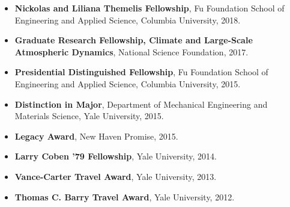 \documentclass[10pt,oneside]{article}
\begin{document}
\mbox{}\vspace{-\dimexpr\baselineskip\relax}

\begin{itemize}[label={}]

  \item \textbf{Nickolas and Liliana Themelis Fellowship}, Fu Foundation School of Engineering and Applied Science, Columbia University, 2018.

  \item \textbf{Graduate Research Fellowship, Climate and Large-Scale Atmospheric Dynamics}, National Science Foundation, 2017.

  \item \textbf{Presidential Distinguished Fellowship}, Fu Foundation School of Engineering and Applied Science, Columbia University, 2015.

  \item \textbf{Distinction in Major}, Department of Mechanical Engineering and Materials Science, Yale University, 2015.

  \item \textbf{Legacy Award}, New Haven Promise, 2015.

  \item \textbf{Larry Coben ’79 Fellowship}, Yale University, 2014.

  \item \textbf{Vance-Carter Travel Award}, Yale University, 2013.

  \item \textbf{Thomas C. Barry Travel Award}, Yale University, 2012.

\end{itemize}


%
%
%
%  
%        
%        
\end{document}

